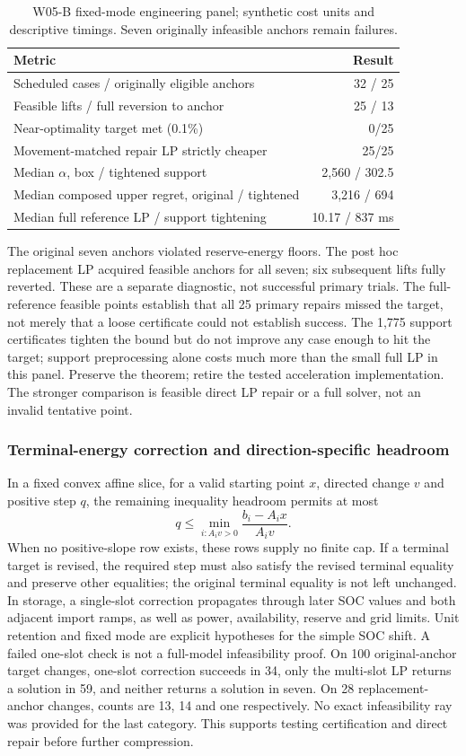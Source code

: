 \documentclass[11pt,letterpaper]{article}
\begin{document}
\begin{table}[htbp]\centering\small
\caption{W05-B fixed-mode engineering panel; synthetic cost units and descriptive timings. Seven originally infeasible anchors remain failures.}
\begin{tabularx}{\linewidth}{Y r}\toprule
Metric & Result\\\midrule
Scheduled cases / originally eligible anchors & 32 / 25\\
Feasible lifts / full reversion to anchor & 25 / 13\\
Near-optimality target met (0.1\%) & 0/25\\
Movement-matched repair LP strictly cheaper & 25/25\\
Median $\alpha$, box / tightened support & 2,560 / 302.5\\
Median composed upper regret, original / tightened & 3,216 / 694\\
Median full reference LP / support tightening & 10.17 / 837 ms\\\bottomrule
\end{tabularx}
\end{table}
The original seven anchors violated reserve-energy floors. The post hoc replacement LP acquired feasible anchors for all seven; six subsequent lifts fully reverted. These are a separate diagnostic, not successful primary trials. The full-reference feasible points establish that all 25 primary repairs missed the target, not merely that a loose certificate could not establish success. The 1,775 support certificates tighten the bound but do not improve any case enough to hit the target; support preprocessing alone costs much more than the small full LP in this panel. Preserve the theorem; retire the tested acceleration implementation. The stronger comparison is feasible direct LP repair or a full solver, not an invalid tentative point.

\subsubsection{Terminal-energy correction and direction-specific headroom}
In a fixed convex affine slice, for a valid starting point $x$, directed change $v$ and positive step $q$, the remaining inequality headroom permits at most
\[
 q\le\min_{i:A_iv>0}\frac{b_i-A_ix}{A_iv}.
\]
When no positive-slope row exists, these rows supply no finite cap. If a terminal target is revised, the required step must also satisfy the revised terminal equality and preserve other equalities; the original terminal equality is not left unchanged. In storage, a single-slot correction propagates through later SOC values and both adjacent import ramps, as well as power, availability, reserve and grid limits. Unit retention and fixed mode are explicit hypotheses for the simple SOC shift. A failed one-slot check is not a full-model infeasibility proof. On 100 original-anchor target changes, one-slot correction succeeds in 34, only the multi-slot LP returns a solution in 59, and neither returns a solution in seven. On 28 replacement-anchor changes, counts are 13, 14 and one respectively. No exact infeasibility ray was provided for the last category. This supports testing certification and direct repair before further compression.
\end{document}

